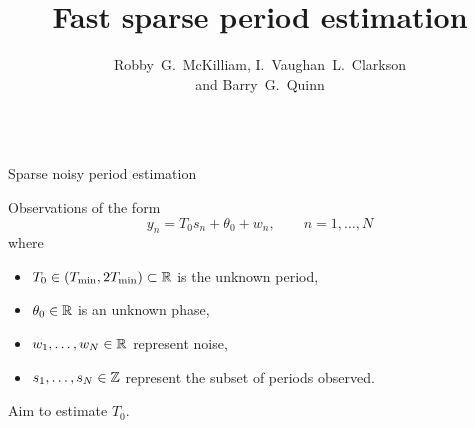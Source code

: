\documentclass[final,hyperref={pdfpagelabels=false}]{beamer}
\title[]{Fast sparse period estimation}
\author{Robby~G.~McKilliam, I.~Vaughan~L.~Clarkson \\ and Barry~G.~Quinn}
\begin{document}


\begin{columns}[t] %
\begin{column}{.49\textwidth} %

\newcommand{\Tmin}{T_{\text{min}}}
\newcommand{\Tmax}{2T_{\text{min}}}

\begin{block}{Sparse noisy period estimation}

Observations of the form
\[
y_n = T_0 s_n + \theta_0 + w_n, \qquad n = 1,\dots,N
\]
where
\begin{itemize}
\item $T_0 \in (\Tmin, \Tmax) \subset \reals$ is the unknown period,
\item $\theta_0 \in {\mathbb R}$ is an unknown phase,
\item $w_1,\dots,w_N \in {\mathbb R}$ represent noise,
\item $s_1,\dots,s_N \in {\mathbb Z}$ represent the subset of periods observed.
\end{itemize}
Aim to estimate $T_0$.

{
\def\vertgap{2}
\def\ph{0.4}
\def\T{1.1}

\newcommand{\raxis}{\draw[-> new,arrow head=2mm] (-0.25,0) -- (8,0) node[above] {$\reals$}; \draw (0,-0.06)-- node[below] {$0$} (0,0.06) }
\newcommand{\pulse}[1]{ \draw[-latex new,arrow head=4mm] (#1,0) -- (#1,1) }
\newcommand{\pulsewithnode}[2]{ \draw[-latex new,arrow head=4mm] (#1,0) -- node[right] {#2} (#1,1) }
\begin{figure}[t]
	\centering
{} 
		\label{fig_stat_model}
\end{figure}
}



\end{block}
\end{column}
\end{columns}
\end{document}
